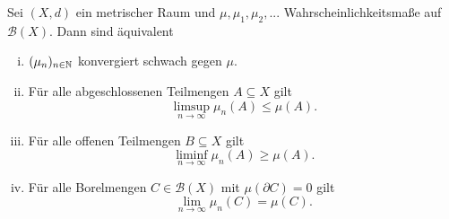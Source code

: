 
\begin{theorem}
    Sei $(X,d)$ ein metrischer Raum und $\mu, \mu_1, \mu_2,...$ Wahrscheinlichkeitsmaße auf $\mathcal{B}(X)$. Dann sind äquivalent
    \begin{enumerate}[(i)]
        \item $(\mu_n)_{n \in \mathbb{N}}$ konvergiert schwach gegen $\mu$.
        \item Für alle abgeschlossenen Teilmengen $A \subseteq X$ gilt 
        $$
            \limsup_{n \to \infty} \mu_n(A) \leq \mu(A).
        $$
        \item Für alle offenen Teilmengen $B \subseteq X$ gilt 
        $$
            \liminf_{n \to \infty} \mu_n(A) \geq \mu(A).
        $$
        \item Für alle Borelmengen $C \in \mathcal{B}(X)$ mit $\mu(\partial C) = 0$ gilt 
        $$
            \lim_{n \to \infty}\mu_n(C) = \mu(C).
        $$
    \end{enumerate}
\end{theorem}

